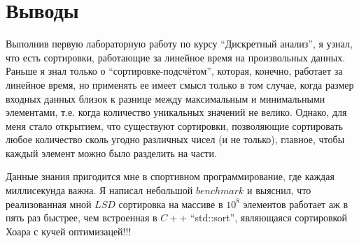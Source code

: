 \section{Выводы}

Выполнив первую лабораторную работу по курсу \enquote{Дискретный анализ}, я узнал, что есть сортировки, работающие за линейное время на произвольных данных. Раньше я знал только о \enquote{сортировке-подсчётом}, которая, конечно, работает за линейное время, но применять ее имеет смысл только в том случае, когда размер входных данных близок к разнице между максимальным и минимальными элементами, т.е. когда количество уникальных значений не велико. Однако, для меня стало открытием, что существуют сортировки, позволяющие сортировать любое количество сколь угодно различных чисел (и не только), главное, чтобы каждый элемент можно было разделить на части.

Данные знания пригодится мне в спортивном программирование, где каждая миллисекунда важна. Я написал небольшой $benchmark$ и выяснил, что реализованная мной $LSD$ сортировка на массиве в $10^8$ элементов работает аж в пять раз быстрее, чем встроенная в $C++$ \enquote{std::sort}, являющаяся сортировкой Хоара с кучей оптимизацей!!! 
\pagebreak
